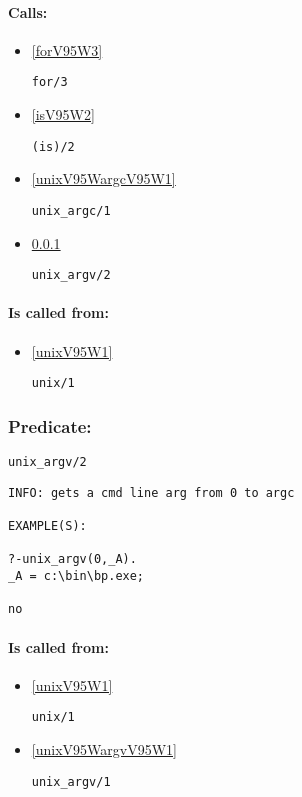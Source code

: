\paragraph{Calls:} 
\begin{itemize}
\item \ref{forV95W3} 
\begin{verbatim}
for/3
\end{verbatim}

\item \ref{isV95W2} 
\begin{verbatim}
(is)/2
\end{verbatim}

\item \ref{unixV95WargcV95W1} 
\begin{verbatim}
unix_argc/1
\end{verbatim}

\item \ref{unixV95WargvV95W2} 
\begin{verbatim}
unix_argv/2
\end{verbatim}

\end{itemize}
\paragraph{Is called from:} 
\begin{itemize}
\item \ref{unixV95W1} 
\begin{verbatim}
unix/1
\end{verbatim}

\end{itemize}

\subsubsection{Predicate:} \label{unixV95WargvV95W2}

\begin{verbatim}
unix_argv/2
\end{verbatim}

{\small \begin{verbatim}
INFO: gets a cmd line arg from 0 to argc

EXAMPLE(S):

?-unix_argv(0,_A).
_A = c:\bin\bp.exe;

no

\end{verbatim}}
\paragraph{Is called from:} 
\begin{itemize}
\item \ref{unixV95W1} 
\begin{verbatim}
unix/1
\end{verbatim}

\item \ref{unixV95WargvV95W1} 
\begin{verbatim}
unix_argv/1
\end{verbatim}

\end{itemize}

